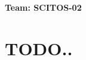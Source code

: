 \documentclass[12pt, a4paper, twocolumn]{article}
\begin{document}
\textbf{Team: SCITOS-02}

\section{TODO..}
\end{document}
